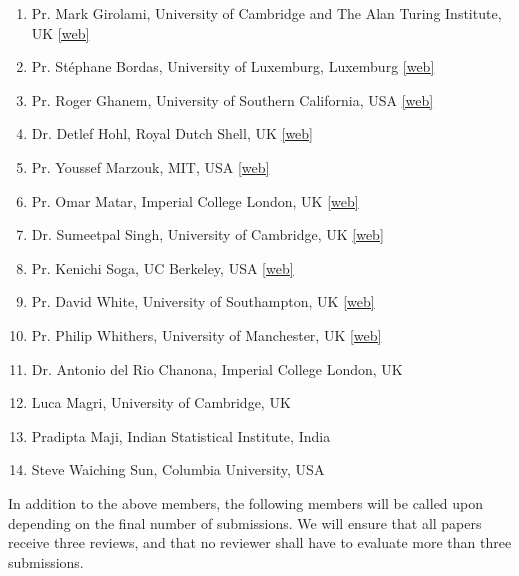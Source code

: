 \documentclass[11pt,a4paper]{scrartcl}
\theoremstyle{plain}  %
\begin{document}
\begin{enumerate}
  \item Pr. Mark Girolami, University of Cambridge and The Alan Turing Institute, UK \href{http://www.eng.cam.ac.uk/profiles/mag92}{[web]}
  \item Pr. Stéphane Bordas, University of Luxemburg, Luxemburg \href{https://wwwfr.uni.lu/recherche/fstm/doe/members/stephane_bordas}{[web]}
  \item Pr. Roger Ghanem, University of Southern California, USA \href{https://viterbi.usc.edu/directory/faculty/Ghanem/Roger}{[web]}
  \item Dr. Detlef Hohl, Royal Dutch Shell, UK \href{https://www.turing.ac.uk/people/researchers/detlef-hohl}{[web]}
  \item Pr. Youssef Marzouk, MIT, USA \href{https://aeroastro.mit.edu/faculty-research/faculty-list/youssef-m-marzouk}{[web]}
  \item Pr. Omar Matar, Imperial College London, UK \href{https://www.imperial.ac.uk/people/o.matar}{[web]}
  \item Dr. Sumeetpal Singh, University of Cambridge, UK \href{http://www.eng.cam.ac.uk/profiles/sss40}{[web]}
  \item Pr. Kenichi Soga, UC Berkeley, USA \href{https://ce.berkeley.edu/people/faculty/soga}{[web]}
  \item Pr. David White, University of Southampton, UK \href{https://www.southampton.ac.uk/engineering/about/staff/djw1g17.page}{[web]}
  \item Pr. Philip Whithers, University of Manchester, UK \href{https://www.research.manchester.ac.uk/portal/p.j.withers.html}{[web]}
  \item Dr. Antonio del Rio Chanona, Imperial College London, UK
  \item Luca Magri, University of Cambridge, UK
  \item Pradipta Maji, Indian Statistical Institute, India
  \item Steve Waiching Sun, Columbia University, USA
\end{enumerate}

In addition to the above members, the following members will be called upon depending on the final number of submissions. We will ensure that all papers receive three reviews, and that no reviewer shall have to evaluate more than three submissions.
\end{document}
